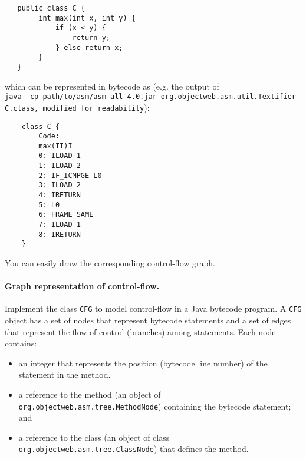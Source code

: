 \documentclass[10pt]{article}
\begin{document}
{{\scriptsize 
\begin{lstlisting}
   public class C {
        int max(int x, int y) {
            if (x < y) {
                return y;
            } else return x;
        }
   }
\end{lstlisting}}
\noindent
which can be represented in bytecode as (e.g. the output of \\{\tt java -cp path/to/asm/asm-all-4.0.jar org.objectweb.asm.util.Textifier C.class, modified for readability}):
{\scriptsize
    \begin{lstlisting}
    class C {
        Code:
        max(II)I
        0: ILOAD 1
        1: ILOAD 2
        2: IF_ICMPGE L0
        3: ILOAD 2
        4: IRETURN
        5: L0
        6: FRAME SAME
        7: ILOAD 1
        8: IRETURN
    }
    \end{lstlisting}
}
%
You can easily draw the corresponding control-flow graph.

\paragraph{Graph representation of control-flow.}

Implement the class {\tt CFG} to model control-flow in a Java bytecode
program. A {\tt CFG} object has a set of nodes that represent bytecode
statements and a set of edges that represent the flow of control
(branches) among statements. Each node contains:

\begin{itemize}
\item an integer that represents the position (bytecode line number) of the statement in the method.
\item a reference to the method (an object of {\tt org.objectweb.asm.tree.MethodNode}) containing the bytecode statement; and
\item a reference to the class (an object of class {\tt org.objectweb.asm.tree.ClassNode}) that defines the method.
\end{itemize}

}
\end{document}

